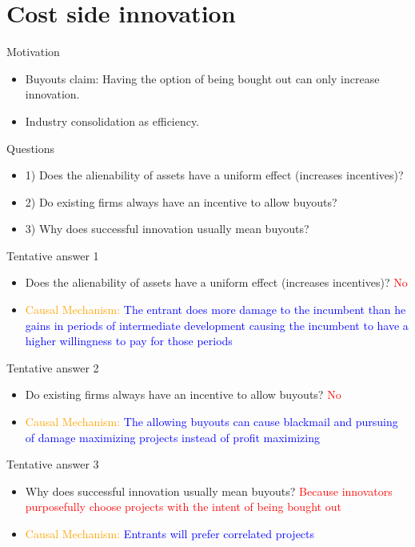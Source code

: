 \documentclass{beamer}
\numberwithin{equation}{section}
\begin{document}
\section{Cost side innovation}
\begin{frame}{Motivation}
\begin{itemize}
    \item Buyouts claim: Having the option of being bought out can only increase innovation. 
    \item Industry consolidation as efficiency.
\end{itemize}
\end{frame}
\begin{frame}{Questions}
\begin{itemize}
    \item 1) Does the alienability of assets have a uniform effect (increases incentives)?
    \item 2) Do existing firms always have an incentive to allow buyouts?
    \item 3) Why does successful innovation usually mean buyouts?  
\end{itemize}
\end{frame}
\begin{frame}{Tentative answer 1}
\begin{itemize}
    \item Does the alienability of assets have a uniform effect (increases incentives)? \textcolor{red}{No}
    \item \textcolor{orange}{Causal Mechanism:} \textcolor{blue}{The entrant does more damage to the incumbent than he gains in periods of intermediate development causing the incumbent to have a higher willingness to pay for those periods}
\end{itemize}
\end{frame}
\begin{frame}{Tentative answer 2}
\begin{itemize}
    \item Do existing firms always have an incentive to allow buyouts? \textcolor{red}{No}
    \item \textcolor{orange}{Causal Mechanism:} \textcolor{blue}{The allowing buyouts can cause blackmail and pursuing of damage maximizing projects instead of profit maximizing}
\end{itemize}
\end{frame}
\begin{frame}{Tentative answer 3}
\begin{itemize}
    \item Why does successful innovation usually mean buyouts? \textcolor{red}{Because innovators purposefully choose projects with the intent of being bought out}
    \item \textcolor{orange}{Causal Mechanism:} \textcolor{blue}{Entrants will prefer correlated projects}
\end{itemize}
\end{frame}
\end{document}

